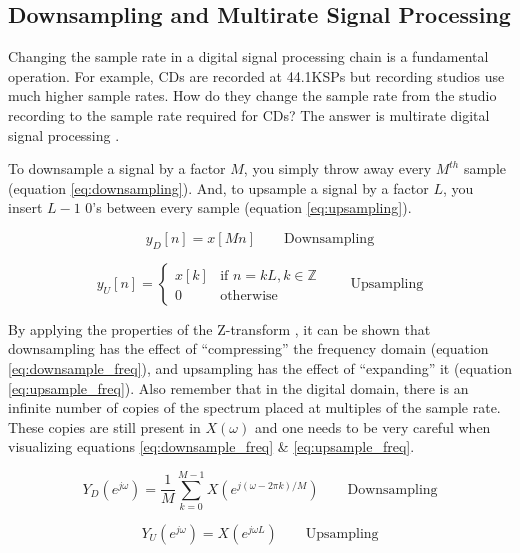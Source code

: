 \documentclass[a4paper, 12pt, notitlepage]{article}
\begin{document}
\subsection{Downsampling and Multirate Signal Processing}
\label{sec:downsampling}
Changing the sample rate in a digital signal processing chain is a fundamental operation.  For example, CDs are recorded at 44.1KSPs but recording studios use much higher sample rates.  How do they change the sample rate from the studio recording to the sample rate required for CDs?  The answer is multirate digital signal processing \cite{multirate1} \cite{multirate2}.

To downsample a signal by a factor $M$, you simply throw away every $M^{th}$ sample (equation \ref{eq:downsampling}).  And, to upsample a signal by a factor $L$, you insert $L - 1$ 0's between every sample (equation \ref{eq:upsampling}).

\begin{equation}
\label{eq:downsampling}
y_D[n] = x[Mn] \qquad \text{Downsampling}
\end{equation}

\begin{equation}
\label{eq:upsampling}
y_U[n] = 
  \begin{cases}
    x[k] & \text{if } n = kL, k \in \mathbb{Z} \\
    0 & \text{otherwise}
  \end{cases}
  \qquad \text{Upsampling}
\end{equation}

By applying the properties of the Z-transform \cite{multirate2}, it can be shown that downsampling has the effect of ``compressing'' the frequency domain (equation \ref{eq:downsample_freq}), and upsampling has the effect of ``expanding'' it (equation \ref{eq:upsample_freq}).  Also remember that in the digital domain, there is an infinite number of copies of the spectrum placed at multiples of the sample rate.  These copies are still present in $X(\omega)$ and one needs to be very careful when visualizing equations \ref{eq:downsample_freq} \& \ref{eq:upsample_freq}.

\begin{equation}
\label{eq:downsample_freq}
Y_D(e^{j\omega}) = \frac{1}{M}\sum_{k=0}^{M-1}X(e^{j(\omega - 2\pi k)/M}) \qquad \text{Downsampling}
\end{equation}

\begin{equation}
\label{eq:upsample_freq}
Y_U(e^{j\omega}) = X(e^{j\omega L}) \qquad \text{Upsampling}
\end{equation}
\end{document}

